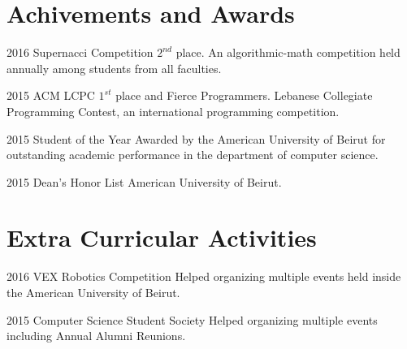 \documentclass{tccv}
\begin{document}
\section{Achivements and Awards}

\begin{yearlist}

\item{2016}
     {Supernacci Competition}
     {$2^{nd}$ place. An algorithmic-math competition held annually among students from all faculties.}

\item{2015}
     {ACM LCPC}
     {$1^{st}$ place and Fierce Programmers. Lebanese Collegiate Programming Contest, an international programming competition.}

\item{2015}
     {Student of the Year}
     {Awarded by the American University of Beirut for outstanding academic performance in the department of computer science.}

\item{2015}
     {Dean's Honor List}
     {American University of Beirut.}

\end{yearlist}

\section{Extra Curricular Activities}
\begin{yearlist}
\item{2016}
     {VEX Robotics Competition}
     {Helped organizing multiple events held inside the American University of Beirut.}


\item{2015}
     {Computer Science Student Society}
     {Helped organizing multiple events including Annual Alumni Reunions.}

\end{yearlist}
\end{document}
